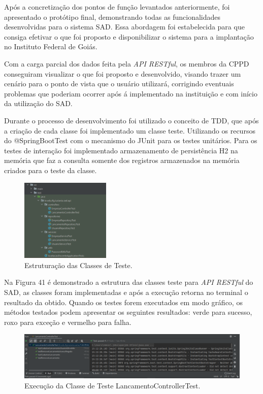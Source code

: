     Após a concretização dos pontos de função levantados anteriormente, foi apresentado o protótipo final, demonstrando todas as funcionalidades desenvolvidas para o sistema SAD. Essa abordagem foi estabelecida para que consiga efetivar o que foi proposto e disponibilizar o sistema para a implantação no Instituto Federal de Goiás. 

    Com a carga parcial dos dados feita pela \textit{API RESTful}, os membros da CPPD conseguiram visualizar o que foi proposto e desenvolvido, visando trazer um cenário para o ponto de vista que o usuário utilizará, corrigindo eventuais problemas que poderiam ocorrer após á implementado na instituição e com início da utilização do SAD. 
    
    Durante o processo de desenvolvimento foi utilizado o conceito de TDD, que após a criação de cada classe foi implementado um classe teste. Utilizando os recursos do @SpringBootTest com o mecanismo do JUnit para os testes unitários. Para os testes de interação foi implementado armazenamento de persistência H2 na memória que faz a consulta somente dos registros armazenados na memória criados para o teste da classe. 

        \begin{figure}[h]
        \centering
        \includegraphics[width=0.38\textwidth]{./img/ClasseTeste.png}
        \caption{Estruturação das Classes de Teste.}
        \label{fig:ClasseTeste}
        \end{figure}

    Na Figura 41 é demonstrado a estrutura das classes teste para \textit{API RESTful} do SAD, as classes foram implementadas e após a execução retorna no terminal o resultado da obtido. Quando os testes forem executados em modo gráfico, os métodos testados podem apresentar os seguintes resultados: verde para sucesso, roxo para exceção  e vermelho para falha.

        \begin{figure}[h]
        \centering
        \includegraphics[width=1.0\textwidth]{./img/ClasseTesteTerminal.png}
        \caption{Execução da Classe de Teste LancamentoControllerTest.}
        \label{fig:ClasseTesteTerminal}
        \end{figure}

